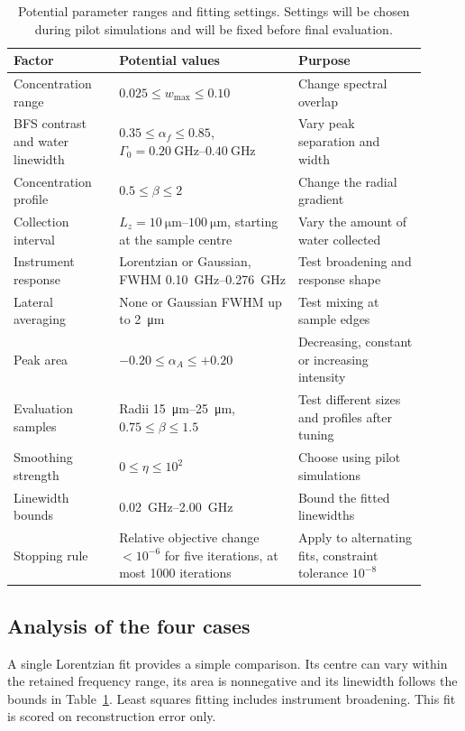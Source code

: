 \documentclass[11pt]{article}
\newcommand{\wmax}{w_{\max}}
\begin{document}
\begin{table}[htbp]
\centering\small
\caption{Potential parameter ranges and fitting settings. Settings will be chosen during pilot simulations and will be fixed before final evaluation.}
\label{tab:settings}
\begin{tabular}{@{}p{0.23\linewidth}p{0.39\linewidth}p{0.29\linewidth}@{}}
\toprule \textbf{Factor} & \textbf{Potential values} & \textbf{Purpose} \\ \midrule
Concentration range & $0.025\leq\wmax\leq0.10$ & Change spectral overlap \\
BFS contrast and water linewidth & $0.35\leq\alpha_f\leq0.85$, $\Gamma_0=\qtyrange{0.20}{0.40}{\giga\hertz}$ & Vary peak separation and width \\
Concentration profile & $0.5\leq\beta\leq2$ & Change the radial gradient \\
Collection interval & $L_z=\qtyrange{10}{100}{\micro\metre}$, starting at the sample centre & Vary the amount of water collected \\
Instrument response & Lorentzian or Gaussian, FWHM \qtyrange{0.10}{0.276}{\giga\hertz} & Test broadening and response shape \\
Lateral averaging & None or Gaussian FWHM up to \qty{2}{\micro\metre} & Test mixing at sample edges \\
Peak area & $-0.20\leq\alpha_A\leq+0.20$ & Decreasing, constant or increasing intensity \\
Evaluation samples & Radii \qtyrange{15}{25}{\micro\metre}, $0.75\leq\beta\leq1.5$ & Test different sizes and profiles after tuning \\
Smoothing strength & $0\leq\eta\leq10^2$ & Choose using pilot simulations \\
Linewidth bounds & \qtyrange{0.02}{2.00}{\giga\hertz} & Bound the fitted linewidths \\
Stopping rule & Relative objective change $<10^{-6}$ for five iterations, at most 1000 iterations & Apply to alternating fits, constraint tolerance $10^{-8}$ \\
\bottomrule
\end{tabular}
\end{table}

\subsection{Analysis of the four cases}
\label{sec:analysis}

A single Lorentzian fit provides a simple comparison. Its centre can vary within the retained frequency range, its area is nonnegative and its linewidth follows the bounds in Table~\ref{tab:settings}. Least squares fitting includes instrument broadening. This fit is scored on reconstruction error only.
\end{document}
